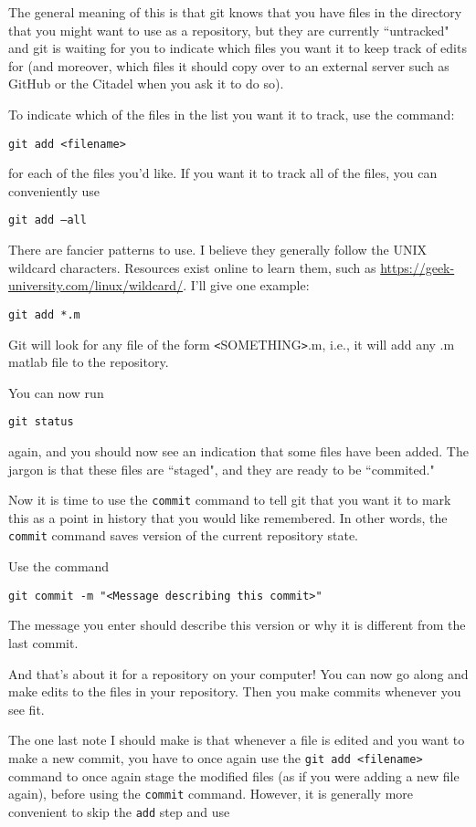 \documentclass[11pt]{article}
\newcommand{\code}[1]{\begin{adjustwidth}{0.5in}{0in}
    \texttt{#1}
    \end{adjustwidth}}
\begin{document}
The general meaning of this is that git knows that you have files in the directory that you might want to use as a repository, but they are currently ``untracked" and git is waiting for you to indicate which files you want it to keep track of edits for (and moreover, which files it should copy over to an external server such as GitHub or the Citadel when you ask it to do so).

To indicate which of the files in the list you want it to track, use the command:

\quad \texttt{git add <filename>}

for each of the files you'd like.  If you want it to track all of the files, you can conveniently use

\quad \texttt{git add --all}

There are fancier patterns to use.  I believe they generally follow the UNIX wildcard characters.  Resources exist online to learn them, such as \url{https://geek-university.com/linux/wildcard/}.  I'll give one example:

 \quad \texttt{git add *.m}
 
 Git will look for any file of the form \texttt{<}SOMETHING\texttt{>}.m, i.e., it will add any .m matlab file to the repository.
 
 You can now run 
 
 \quad \texttt{git status}
 
 again, and you should now see an indication that some files have been added.  The jargon is that these files are ``staged", and they are ready to be ``commited."
 
 Now it is time to use the \texttt{commit} command to tell git that you want it to mark this as a point in history that you would like remembered.  In other words, the \texttt{commit} command saves version of the current repository state.  
 
 Use the command
 
 \code{git commit -m "<Message describing this commit>"}

The message you enter should describe this version or why it is different from the last commit.

And that's about it for a repository on your computer!  You can now go along and make edits to the files in your repository.  Then you make commits whenever you see fit.  

The one last note I should make is that whenever a file is edited and you want to make a new commit, you have to once again use the \texttt{git add <filename>} command to once again stage the modified files (as if you were adding a new file again), before using the \texttt{commit} command.  However, it is generally more convenient to skip the \texttt{add} step and use
\end{document}
